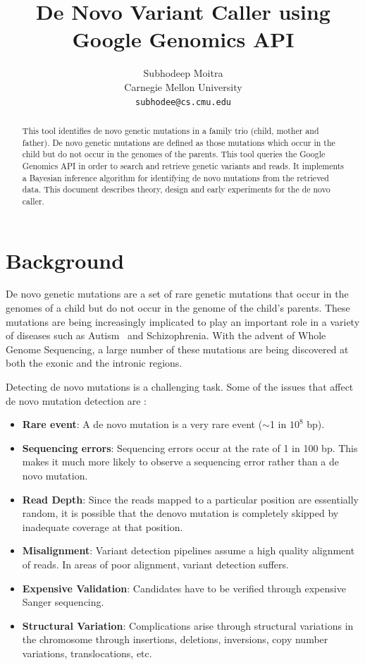 \documentclass{article}
\begin{document}
\title{De Novo Variant Caller using Google Genomics API}

\author{
	Subhodeep Moitra\\ 
	Carnegie Mellon University \\
	{\tt subhodee@cs.cmu.edu}
}

\maketitle

\begin{abstract}
This tool identifies de novo genetic mutations in a family trio (child, mother and father). De novo genetic mutations are defined as those mutations which occur in the child but do not occur in the genomes of the parents. This tool queries the Google Genomics API in order to search and retrieve genetic variants and reads. It implements a Bayesian inference algorithm for identifying  de novo mutations from the retrieved data. This document describes theory, design and early experiments for the de novo caller. 
\end{abstract} 

\section{Background}
De novo genetic mutations are a set of rare genetic mutations that occur in the genomes of a child but do not occur in the genome of the child's parents. These mutations are being increasingly implicated to play an important role in a variety of diseases such as Autism~\cite{Michaelson2012} and Schizophrenia. With the advent of Whole Genome Sequencing, a large number of these mutations are being discovered at both the exonic and the intronic regions. 

\vspace{1em}
Detecting de novo mutations is a challenging task. Some of the issues that affect de novo mutation detection are : 
\begin{itemize}
\item \textbf{Rare event}: A de novo mutation is a very rare event ($\sim$1 in $10^8$ bp).
\item \textbf{Sequencing errors}: Sequencing errors occur at the rate of 1 in 100 bp. This makes it much more likely to observe a sequencing error rather than a de novo mutation.
\item \textbf{Read Depth}: Since the reads mapped to a particular position are essentially random, it is possible that the denovo mutation is completely skipped by inadequate coverage at that position.
\item \textbf{Misalignment}: Variant detection pipelines assume a high quality alignment of reads. In areas of poor alignment, variant detection suffers.
\item \textbf{Expensive Validation}: Candidates have to be verified through expensive Sanger sequencing.
\item \textbf{Structural Variation}: Complications arise through structural variations in the chromosome through insertions, deletions, inversions, copy number variations, translocations, etc.
\end{itemize}
\end{document}

